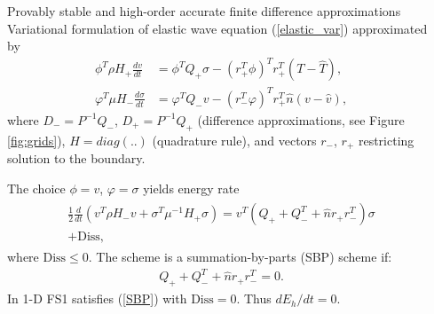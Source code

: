 \documentclass[final]{beamer}
\newlength{\onecolwid}
\newlength{\twocolwid}
\begin{document}
\begin{frame}[t]
\begin{columns}[t]
\begin{column}{\twocolwid}
\begin{columns}[t,totalwidth=\twocolwid]
\begin{column}{\onecolwid}
\end{column} %

\begin{column}{\onecolwid} %

  \begin{block}{Provably stable and high-order accurate finite difference approximations}
    Variational formulation of elastic wave equation (\ref{elastic_var}) approximated by
    \begin{align}
      \phi^T\rho H_+ \frac{dv}{dt} &=\phi^T Q_+ \sigma -(r^T_+\phi)^T r^T_+(T-\hat{T}), 
      \nonumber
      \\
      \varphi^T\mu  H_- \frac{d\sigma}{dt} &=\varphi^T Q_- v -(r^T_-\varphi)^T r^T_+\hat{n}(v- \hat{v}), 
      \nonumber
    \end{align}
    where $D_- = P^{-1}Q_-$, $D_+ = P^{-1}Q_+$ (difference approximations, see Figure \ref{fig:grids}), $H = diag(..)$
    (quadrature rule), and vectors $r_-$, $r_+$ restricting solution to
    the boundary.

    The choice $\phi = v$, $\varphi = \sigma$ yields energy rate
    \begin{align}
      \begin{split}
      \frac{1}{2}\frac{d}{dt}(v^T\rho H_-v + \sigma^T\mu^{-1}H_+\sigma) = v^T(Q_+ + Q_-^T + \hat{n}r_+r_-^T)\sigma \\
      + \mbox{Diss}, 
    \end{split}
      \nonumber
    \end{align}
    where $\mbox{Diss} \leq 0.$ The scheme is a summation-by-parts (SBP) scheme if:
    \begin{align}
    Q_+ + Q_-^T + \hat{n}r_+r_-^T = 0.
    \label{SBP}
    \end{align}
    In 1-D FS1 satisfies (\ref{SBP}) with $\mbox{Diss} = 0$. Thus
      $dE_h/dt = 0.$


  \end{block}




\end{column} %

\end{columns} %

\end{column} %


\end{columns}
\end{frame}
\end{document}
